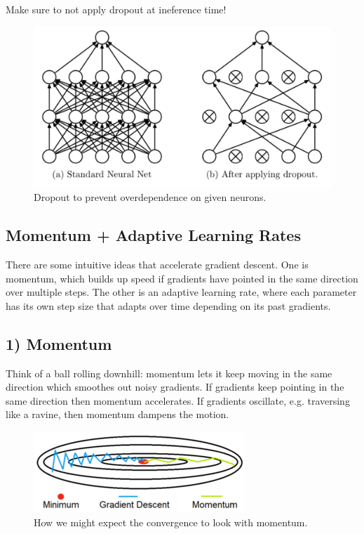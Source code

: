 \documentclass[11pt]{article}
\begin{document}
Make sure to not apply dropout at ineference time!

\begin{figure}[t]
    \centering
    \includegraphics[width=\textwidth]{./figures/neural_nets/REG_dropout.png}
    \caption{Dropout to prevent overdependence on given neurons. }
    \label{fig:dropout}
\end{figure}

\subsection{Momentum + Adaptive Learning Rates}
There are some intuitive ideas that accelerate gradient descent. One is momentum, which builds up speed if gradients have pointed in the same direction over multiple steps. The other is an adaptive learning rate, where each parameter has its own step size that adapts over time depending on its past gradients.

\subsection*{1) Momentum}
Think of a ball rolling downhill: momentum lets it keep moving in the same direction which smoothes out noisy gradients. If gradients keep pointing in the same direction then momentum accelerates. If gradients oscillate, e.g. traversing like a ravine, then momentum dampens the motion.

\begin{figure}[t]
    \centering
    \includegraphics[width=\columnwidth]{./figures/gradient_descent/momentum.png}
    \caption{How we might expect the convergence to look with momentum. }
    \label{fig:gradient_descent_momentum}
\end{figure}
\end{document}
